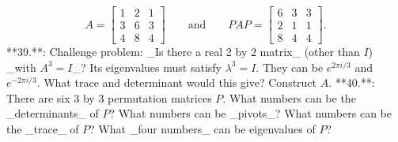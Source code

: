 \[A=\begin{bmatrix}1&2&1\\ 3&6&3\\ 4&8&4\end{bmatrix}\qquad\text{and}\qquad PAP=\begin{bmatrix}6&3&3\\ 2&1&1\\ 8&4&4\end{bmatrix}.\]
**39.**: Challenge problem: _Is there a real 2 by \(2\) matrix_ (other than \(I\)) _with \(A^{3}=I\)_? Its eigenvalues must satisfy \(\lambda^{3}=I\). They can be \(e^{2\pi i/3}\) and \(e^{-2\pi i/3}\). What trace and determinant would this give? Construct \(A\).
**40.**: There are six 3 by 3 permutation matrices \(P\). What numbers can be the _determinants_ of \(P\)? What numbers can be _pivots_? What numbers can be the _trace_ of \(P\)? What _four numbers_ can be eigenvalues of \(P\)?